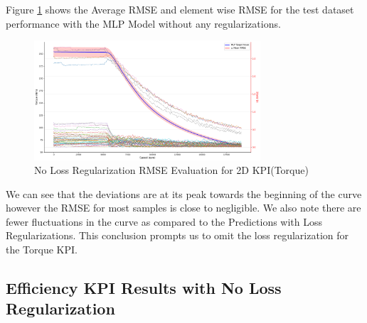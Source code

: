 \documentclass{report} %
\begin{document}
Figure \ref{fig:No Loss Regularization RMSE Evaluation for 2D KPI(Torque)} shows the Average \ac{RMSE} and element wise \ac{RMSE} for the test dataset 
performance with the MLP Model without any regularizations.

\begin{figure}[H]
    \centering
    \includegraphics[width=0.75\textwidth]{./ReportImages/RMSE_MLP_no_lossreg_y1.png} 
    \caption{No Loss Regularization \ac{RMSE} Evaluation for 2D KPI(Torque)} 
    \label{fig:No Loss Regularization RMSE Evaluation for 2D KPI(Torque)}
\end{figure}

We can see that the deviations are at its peak towards the beginning of the curve however the \ac{RMSE} for most samples is close to negligible.
We also note there are fewer fluctuations in the curve as compared to the Predictions with Loss Regularizations.
This conclusion prompts us to omit the loss regularization for the Torque \ac{KPI}.

\subsection{Efficiency \ac{KPI} Results with No Loss Regularization}\label{subsec:3D Efficiency Results with No Loss Regularization}
\end{document}
